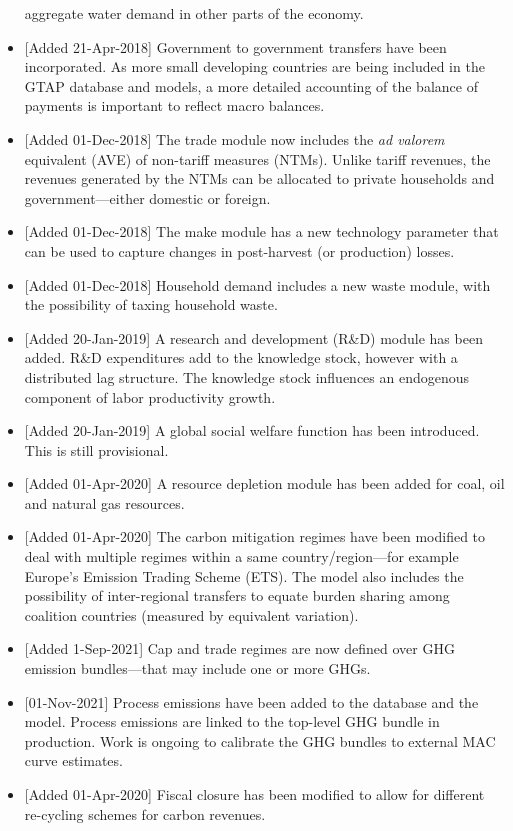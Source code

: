 \documentclass[11pt,letterpaper]{report}
\begin{document}
\begin{itemize}
         aggregate water demand in other parts of the economy.
   \item {[Added 21-Apr-2018] Government to government transfers have been
   incorporated. As more small developing countries are being included in the
   GTAP database and models, a more detailed accounting of the balance of
   payments is important to reflect macro balances.}
   \item {[Added 01-Dec-2018] The trade module now includes the \emph{ad valorem} equivalent (AVE) of non-tariff measures (NTMs). Unlike tariff revenues, the revenues generated by the NTMs can be allocated to private households and government---either domestic or foreign.}
   \item {[Added 01-Dec-2018] The make module has a new technology parameter that can be used to capture changes in post-harvest (or production) losses.}
   \item {[Added 01-Dec-2018] Household demand includes a new waste module, with the possibility of taxing
   household waste.}
   \item {[Added 20-Jan-2019] A research and development (R\&D) module has been added. R\&D expenditures add to the knowledge stock, however with a distributed lag structure. The knowledge stock influences an endogenous component of labor productivity growth.}
   \item {[Added 20-Jan-2019] A global social welfare function has been introduced. This is
   still provisional.}
   \item {[Added 01-Apr-2020] A resource depletion module has been added for coal, oil and natural gas resources.}
   \item {[Added 01-Apr-2020] The carbon mitigation regimes have been modified to deal with multiple regimes within
   a same country/region---for example Europe's Emission Trading Scheme (ETS)}. The model also includes the
   possibility of inter-regional transfers to equate burden sharing among coalition countries (measured by
   equivalent variation).
   \item {[Added 1-Sep-2021] Cap and trade regimes are now defined
   over GHG emission bundles---that may include one or more GHGs.}
   \item {[01-Nov-2021] Process emissions have been added to the database and
   the model. Process emissions are linked to the top-level GHG bundle
   in production. Work is ongoing to calibrate the GHG bundles
   to external MAC curve estimates.}
   \item {[Added 01-Apr-2020]} Fiscal closure has been modified to allow for different re-cycling schemes for carbon revenues.

\end{itemize}
\end{document}
